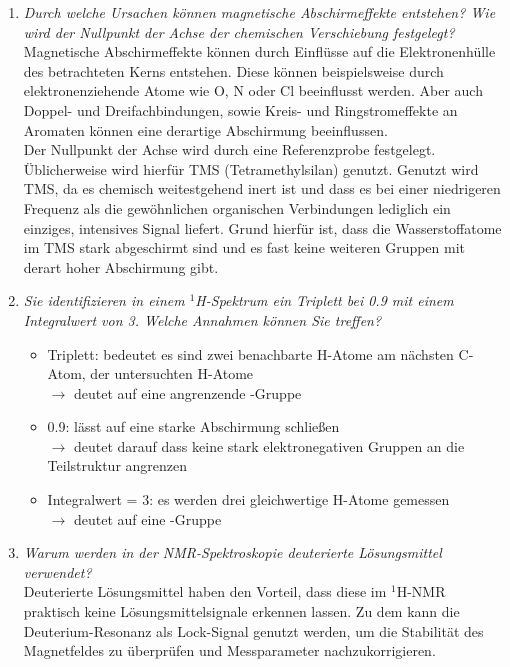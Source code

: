 \begin{enumerate}
	\item \textit{Durch welche Ursachen können magnetische Abschirmeffekte entstehen? Wie wird der Nullpunkt der Achse der chemischen Verschiebung festgelegt?}\vspace{1mm}\\
	Magnetische Abschirmeffekte können durch Einflüsse auf die Elektronenhülle des betrachteten Kerns entstehen. Diese können beispielsweise durch elektronenziehende Atome wie O, N oder Cl beeinflusst werden. Aber auch Doppel- und Dreifachbindungen, sowie Kreis- und Ringstromeffekte an Aromaten können eine derartige Abschirmung beeinflussen.\\
	Der Nullpunkt der Achse wird durch eine Referenzprobe festgelegt. Üblicherweise wird hierfür TMS (Tetramethylsilan) genutzt. Genutzt wird TMS, da es chemisch weitestgehend inert ist und dass es bei einer niedrigeren Frequenz als die gewöhnlichen organischen Verbindungen lediglich ein einziges, intensives Signal liefert. Grund hierfür ist, dass die Wasserstoffatome im TMS stark abgeschirmt sind und es fast keine weiteren Gruppen mit derart hoher Abschirmung gibt.
	\item \textit{Sie identifizieren in einem ${}^1$H-Spektrum ein Triplett bei \SI{0,9}{\ppm} mit einem Integralwert von 3. Welche Annahmen können Sie treffen?}
	\begin{itemize}
		\item Triplett: bedeutet es sind zwei benachbarte H-Atome am nächsten C-Atom, der untersuchten H-Atome \\
		$\rightarrow$ deutet auf eine angrenzende -Gruppe
		\item \SI{0,9}{\ppm}: lässt auf eine starke Abschirmung schließen \\
		$\rightarrow$  deutet darauf dass keine stark elektronegativen Gruppen an die Teilstruktur angrenzen
		\item Integralwert = 3: es werden drei gleichwertige H-Atome gemessen \\
		$\rightarrow$ deutet auf eine -Gruppe
		\end{itemize}
	\item \textit{Warum werden in der NMR-Spektroskopie deuterierte Lösungsmittel verwendet?}\vspace{1mm}\\
	Deuterierte Lösungsmittel haben den Vorteil, dass diese im ${}^1$H-NMR praktisch keine Lösungsmittelsignale erkennen lassen. Zu dem kann die Deuterium-Resonanz als Lock-Signal genutzt werden, um die Stabilität des Magnetfeldes zu überprüfen und Messparameter nachzukorrigieren.
\end{enumerate}

